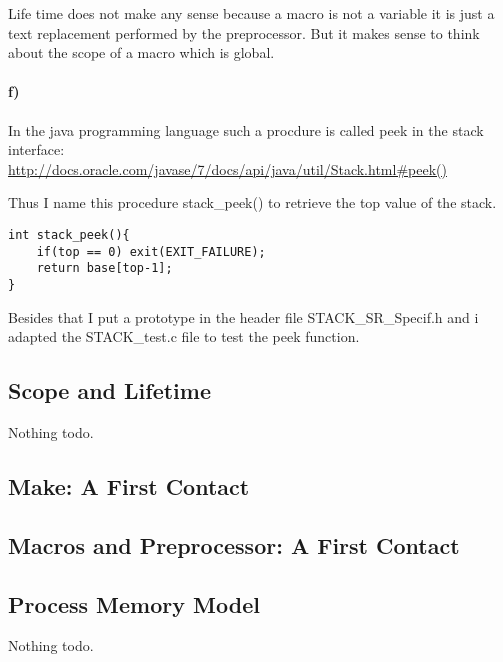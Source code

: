 \documentclass[12pt]{article}
\begin{document}
Life time does not make any sense because a macro is not a variable it is just a text replacement performed by the preprocessor. But it makes sense to think about the scope of a macro which is global.

\paragraph{f)}

In the java programming language such a procdure is called peek in the stack interface:\\ 
\url{http://docs.oracle.com/javase/7/docs/api/java/util/Stack.html#peek()}

Thus I name this procedure stack\_peek() to retrieve the top value of the stack.
\begin{lstlisting}
int stack_peek(){
	if(top == 0) exit(EXIT_FAILURE);
	return base[top-1];
}
\end{lstlisting}

Besides that I put a prototype in the header file STACK\_SR\_Specif.h and i adapted the STACK\_test.c file to test the peek function.
\subsection*{Scope and Lifetime}
Nothing todo.

\subsection*{Make: A First Contact}

\subsection*{Macros and Preprocessor: A First Contact}

\subsection*{Process Memory Model}
Nothing todo.
\end{document}

